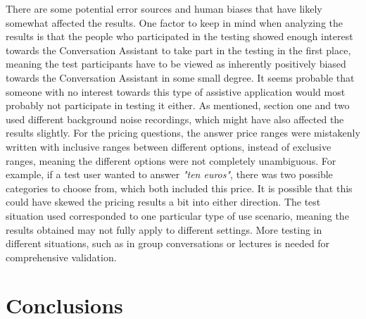 \documentclass[english, 12pt, a4paper, pdftex, elec, utf8]{aaltothesis}
\begin{document}
There are some potential error sources and human biases that have likely somewhat affected the results. One factor to keep in mind when analyzing the results is that the people who participated in the testing showed enough interest towards the Conversation Assistant to take part in the testing in the first place, meaning the test participants have to be viewed as inherently positively biased towards the Conversation Assistant in some small degree. It seems probable that someone with no interest towards this type of assistive application would most probably not participate in testing it either. As mentioned, section one and two used different background noise recordings, which might have also affected the results slightly. For the pricing questions, the answer price ranges were mistakenly written with inclusive ranges between different options, instead of exclusive ranges, meaning the different options were not completely unambiguous. For example, if a test user wanted to answer \textit{"ten euros"}, there was two possible categories to choose from, which both included this price. It is possible that this could have skewed the pricing results a bit into either direction. The test situation used corresponded to one particular type of use scenario, meaning the results obtained may not fully apply to different settings. More testing in different situations, such as in group conversations or lectures  is needed for comprehensive validation.

\section{Conclusions} \label{sec:loppu}
\end{document}
